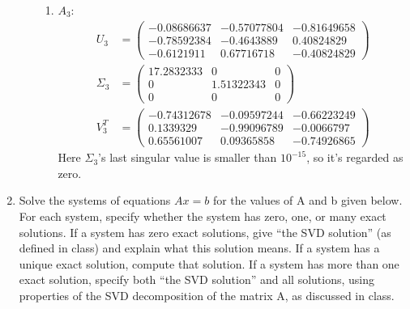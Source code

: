 \documentclass[conference,onecolumn]{IEEEtran}
\begin{document}
\begin{enumerate}[label=\arabic{enumi}.]
\begin{enumerate}
\begin{enumerate}
                        \item $A_3$:
                              \begin{align*}
                                  U_3      & =
                                  \begin{pmatrix}
                                      -0.08686637 & -0.57077804 & -0.81649658 \\
                                      -0.78592384 & -0.4643889  & 0.40824829  \\
                                      -0.6121911  & 0.67716718  & -0.40824829
                                  \end{pmatrix} \\
                                  \Sigma_3 & =
                                  \begin{pmatrix}
                                      17.2832333 & 0          & 0 \\
                                      0          & 1.51322343 & 0 \\
                                      0          & 0          & 0
                                  \end{pmatrix} \\
                                  V_3^T    & =
                                  \begin{pmatrix}
                                      -0.74312678 & -0.09597244 & -0.66223249 \\
                                      0.1339329   & -0.99096789 & -0.0066797  \\
                                      0.65561007  & 0.09365858  & -0.74926865
                                  \end{pmatrix}
                              \end{align*}
                              Here $\Sigma_3$'s last singular value is smaller than $10^{-15}$, so it's regarded as zero.
                    \end{enumerate}
          \end{enumerate}

          \clearpage
    \item Solve the systems of equations $Ax = b$ for the values of A and b given below.
          For each system, specify whether the system has zero, one, or many exact solutions.
          If a system has zero exact solutions, give “the SVD solution” (as defined in class) and explain what this solution means.
          If a system has a unique exact solution, compute that solution.
          If a system has more than one exact solution, specify both “the SVD solution” and all solutions, using properties of the SVD decomposition of the matrix A, as discussed in class.


\end{enumerate}
\end{document}
